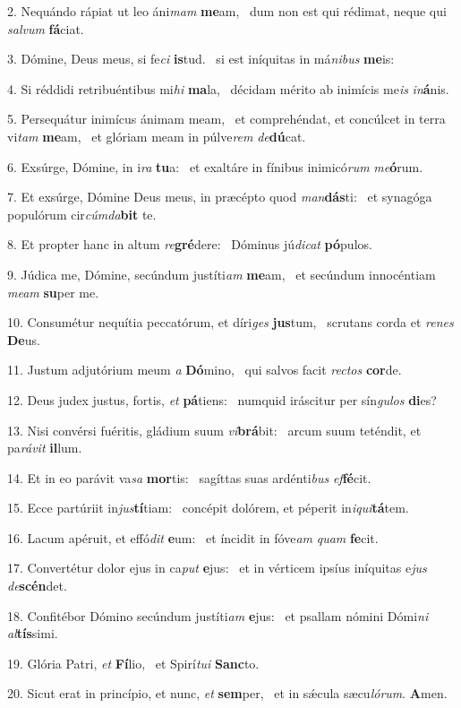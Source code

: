 2. Nequándo rápiat ut leo áni\textit{mam} \textbf{me}am, \ast\  dum non est qui rédimat, neque qui \textit{sal}\textit{vum} \textbf{fá}ciat.\

3. Dómine, Deus meus, si fe\textit{ci} \textbf{is}tud. \ast\  si est iníquitas in má\textit{ni}\textit{bus} \textbf{me}is:\

4. Si réddidi retribuéntibus mi\textit{hi} \textbf{ma}la, \ast\  décidam mérito ab inimícis me\textit{is} \textit{in}\textbf{á}nis.\

5. Persequátur inimícus ánimam meam, \dag\  et comprehéndat, et concúlcet in terra vi\textit{tam} \textbf{me}am, \ast\  et glóriam meam in púlve\textit{rem} \textit{de}\textbf{dú}cat.\

6. Exsúrge, Dómine, in i\textit{ra} \textbf{tu}a: \ast\  et exaltáre in fínibus inimicó\textit{rum} \textit{me}\textbf{ó}rum.\

7. Et exsúrge, Dómine Deus meus, in præcépto quod \textit{man}\textbf{dás}ti: \ast\  et synagóga populórum cir\textit{cúm}\textit{da}\textbf{bit} te.\

8. Et propter hanc in altum \textit{re}\textbf{gré}dere: \ast\  Dóminus jú\textit{di}\textit{cat} \textbf{pó}pulos.\

9. Júdica me, Dómine, secúndum justíti\textit{am} \textbf{me}am, \ast\  et secúndum innocéntiam \textit{me}\textit{am} \textbf{su}per me.\

10. Consumétur nequítia peccatórum, et díri\textit{ges} \textbf{jus}tum, \ast\  scrutans corda et \textit{re}\textit{nes} \textbf{De}us.\

11. Justum adjutórium meum \textit{a} \textbf{Dó}mino, \ast\  qui salvos facit \textit{rec}\textit{tos} \textbf{cor}de.\

12. Deus judex justus, fortis, \textit{et} \textbf{pá}tiens: \ast\  numquid iráscitur per sín\textit{gu}\textit{los} \textbf{di}es?\

13. Nisi convérsi fuéritis, gládium suum \textit{vi}\textbf{brá}bit: \ast\  arcum suum teténdit, et pa\textit{rá}\textit{vit} \textbf{il}lum.\

14. Et in eo parávit va\textit{sa} \textbf{mor}tis: \ast\  sagíttas suas ardénti\textit{bus} \textit{ef}\textbf{fé}cit.\

15. Ecce partúriit in\textit{jus}\textbf{tí}tiam: \ast\  concépit dolórem, et péperit in\textit{i}\textit{qui}\textbf{tá}tem.\

16. Lacum apéruit, et effó\textit{dit} \textbf{e}um: \ast\  et íncidit in fóve\textit{am} \textit{quam} \textbf{fe}cit.\

17. Convertétur dolor ejus in ca\textit{put} \textbf{e}jus: \ast\  et in vérticem ipsíus iníquitas e\textit{jus} \textit{de}\textbf{scén}det.\

18. Confitébor Dómino secúndum justíti\textit{am} \textbf{e}jus: \ast\  et psallam nómini Dómi\textit{ni} \textit{al}\textbf{tís}simi.\

19. Glória Patri, \textit{et} \textbf{Fí}lio, \ast\  et Spirí\textit{tu}\textit{i} \textbf{Sanc}to.\

20. Sicut erat in princípio, et nunc, \textit{et} \textbf{sem}per, \ast\  et in sǽcula sæcu\textit{ló}\textit{rum}. \textbf{A}men.\

